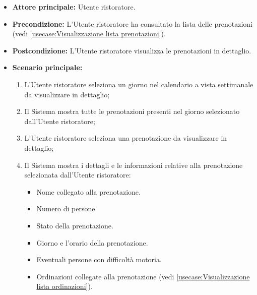\label{usecase:Visualizza dettaglio lista prenotazioni}
\begin{itemize}
	\item \textbf{Attore principale:} Utente ristoratore.

	\item \textbf{Precondizione:} L'Utente ristoratore ha consultato la lista delle prenotazioni (vedi \autoref{usecase:Visualizzazione lista prenotazioni}).

	\item \textbf{Postcondizione:} L'Utente ristoratore visualizza le prenotazioni in dettaglio.


	\item \textbf{Scenario principale:}
	      \begin{enumerate}
		      \item L'Utente ristoratore seleziona un giorno nel calendario a vista settimanale da visualizzare in dettaglio;
		      \item Il Sistema mostra tutte le prenotazioni presenti nel giorno selezionato dall'Utente ristoratore;

		      \item L'Utente ristoratore seleziona una prenotazione da visualizzare in dettaglio;
		      \item Il Sistema mostra i dettagli e le informazioni relative alla prenotazione selezionata dall'Utente ristoratore:
		            \begin{itemize}
			            \item Nome collegato alla prenotazione.
			            \item Numero di persone.
			            \item Stato della prenotazione.
			            \item Giorno e l'orario della prenotazione.
			            \item Eventuali persone con difficoltà motoria.

						\item Ordinazioni collegate alla prenotazione (vedi \autoref{usecase:Visualizzazione lista ordinazioni}).
		            \end{itemize}

	      \end{enumerate}
\end{itemize}
